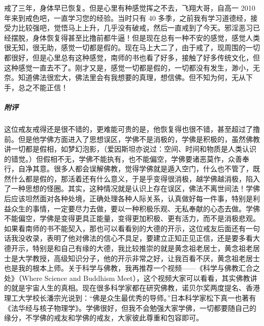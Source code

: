 \begin{case}
    戒了三年，身体早已恢复。但是心里有种感觉挥之不去，飞翔大哥，自高一 2010 年来到戒色吧，一直学习您的经验。当时只有 40 多季，之前我有学习道德经，接受力比较强吧，觉悟马上上升，几乎没有破戒，然后一直戒到了今天。邪淫恶习已经摆脱，身体恢复得甚至比撸前都牛逼！但是现在总有一种不安的感觉，感觉人类很无知，很无助，感觉一切都是假的。现在马上大二了，由于戒了，现周围的一切都很好，但是心里总有这种感觉，南师的书也看了好多，接触了好多传统文化，但这种感觉一直去不了。刚才又是，感觉一切都是假的，一切都没有发生，渺小，无奈。知道佛法很宏大，佛法里会有我想要的真理，想信佛。但不知为何，无从下手，总之不能正信！
    \subparagraph{附评} 这位戒友戒得还是很不错的，更难能可贵的是，他恢复得也很不错，甚至超过了撸前。但是他学佛方面进入了思想误区，学佛不是消极的，学佛是积极的，虽然佛教讲一切都是假相，如梦幻泡影，（爱因斯坦亦说过：空间、时间和物质是人类认识的错觉。）但假相不无，学佛不能执有，也不能偏空，学佛要诸恶莫作，众善奉行，自净其意。很多人都会误解佛教，觉得学佛就是遁入空门，什么也不管了，既然什么都是假的，那活着还有什么意义，于是乎变得很消极，越学佛越消极，陷入了一种思想的怪圈。其实，这种情况就是认识上存在误区，佛法不离世间法！学佛后应该坦然面对各种处境，正确处理各种人际关系，认真做好每一件事，特别是利益众生的事情，一定要尽力去做，要以一种积极乐观、无私奉献的心态去做。学佛不能偏空，学佛是变得更具正能量，变得更加积极、更有活力，而不是消极悲观。如果看南师的书不能契入，那也可以看看别的大德的开示，这位戒友后面还有一句话我没收录，表明了他对佛法的信心不具足，要建立正知正见正信，还是要多看大德开示，特别是和自己有缘的大德，我比较推崇的就是黄念祖老居士，黄念祖老居士是大学教授，高级知识分子，他的开示非常之好，让我百看不厌，黄念祖老居士也是我的根本上师。关于科学与佛教，我再推荐一个视频——《科学与佛教汇合之处》（Where Science and Buddhism Meet），这个视频大家可以看看，其实佛教讲的就是宇宙人生的真相。现在很多科学家都在研究佛教，诺贝尔奖两度提名、香港理工大学校长潘宗光说到：“佛是众生最优秀的导师。”日本科学家松下真一也著有《法华经与核子物理学》。学佛很好，但我不会勉强大家学佛，一切都要随自己的缘分，不学佛的戒友和学佛的戒友，大家彼此尊重和包容即可。
\end{case}

